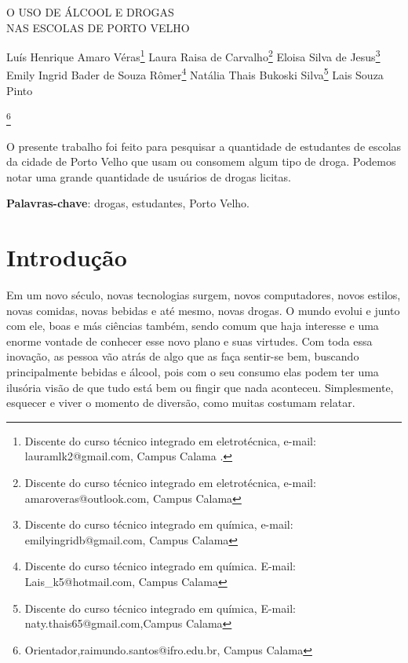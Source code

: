 \documentclass[article,12pt,onesidea,4paper,english,brazil]{abntex2}
\begin{document}
	
	
	\frenchspacing 
	
	\begin{center}
		\LARGE O USO DE ÁLCOOL E DROGAS \\NAS ESCOLAS DE PORTO VELHO
		
		\normalsize
	Luís Henrique Amaro Véras\footnote{Discente do curso técnico integrado em eletrotécnica, e-mail: lauramlk2@gmail.com, Campus Calama .} 
	Laura Raisa de Carvalho\footnote{Discente do curso técnico integrado em eletrotécnica, e-mail: amaroveras@outlook.com, Campus Calama } 
	Eloisa Silva de Jesus\footnote{Discente do curso técnico integrado em química, e-mail: emilyingridb@gmail.com, Campus Calama } \\
		Emily Ingrid Bader de Souza Rômer\footnote{Discente do curso técnico integrado em química. E-mail: Lais\_k5@hotmail.com, Campus Calama } 
	Natália Thais Bukoski Silva\footnote{Discente do curso técnico integrado em química, E-mail: naty.thais65@gmail.com,Campus Calama } 
	Lais Souza Pinto
	
	\footnote{Orientador,raimundo.santos@ifro.edu.br, Campus Calama} 
	\end{center}
	
	\begin{resumoumacoluna}
		O presente trabalho foi feito para pesquisar a quantidade de estudantes  de escolas da cidade de Porto Velho que usam ou consomem algum tipo de droga. Podemos notar uma grande quantidade de usuários de drogas licitas.
		
		\vspace{\onelineskip}
		
		\noindent
		\textbf{Palavras-chave}: drogas, estudantes, Porto Velho.
	\end{resumoumacoluna}
	
	\section*{Introdução}
	
Em um novo século, novas tecnologias surgem, novos computadores, novos estilos, novas comidas, novas bebidas e até mesmo, novas drogas. O mundo evolui e junto com ele, boas e más ciências também, sendo comum que haja interesse e uma enorme vontade de conhecer esse novo plano e suas virtudes. Com toda essa inovação, as pessoa vão atrás de algo que as faça sentir-se bem, buscando principalmente bebidas e álcool, pois com o seu consumo elas podem ter uma ilusória visão de que tudo está bem ou fingir que nada aconteceu. Simplesmente, esquecer e viver o momento de diversão, como muitas costumam relatar.
\end{document}

